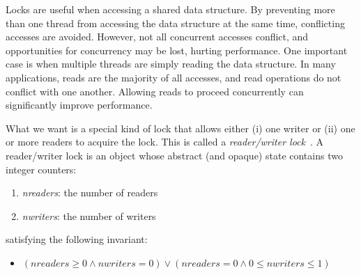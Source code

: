 \documentclass{report}
\newcommand{\harmonysource}[1]{
\begin{tabbing}
XX\=XXX\=XXX\kill
    
\end{tabbing}
}
\newcommand{\harmonylink}[1]{%
[\href{https://harmony.cs.cornell.edu/#1}{\underline{#1}}]%
}
\newenvironment{code}{
\tcolorbox
}{
\endtcolorbox
}
\begin{document}

Locks are useful when accessing a shared data structure.  By preventing
more than one thread from accessing the data structure at the same
time, conflicting accesses are avoided.  However, not all concurrent
accesses conflict, and opportunities for concurrency may be lost,
hurting performance.  One important case is when multiple threads
are simply reading the data structure.
In many applications, reads are the majority of all accesses,
and read operations do not conflict with one another.
Allowing reads to proceed concurrently can significantly improve performance.

What we want is a special kind of lock that allows either (i) one writer
or (ii) one or more readers to acquire the lock.  This is called
a \emph{reader/writer lock}~\cite{CHP71}.
%
A reader/writer lock is an object whose abstract (and opaque)
state contains two integer counters:
\begin{enumerate}
\item \textit{nreaders}: the number of readers
\item \textit{nwriters}: the number of writers
\end{enumerate}
satisfying the following invariant:
\begin{itemize}
\item [] $(\mathit{nreaders} \ge 0 \land \mathit{nwriters} = 0) \lor
    (\mathit{nreaders} = 0 \land 0 \le \mathit{nwriters} \le 1)$
\end{itemize}
\end{document}
